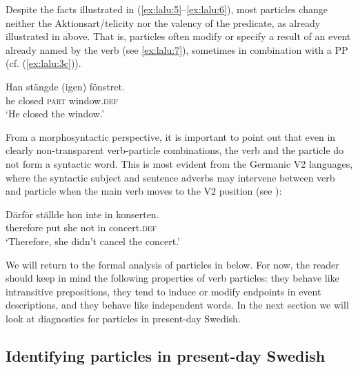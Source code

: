 \documentclass[output=paper]{langscibook}
\begin{document}
\ea\label{ex:lalu:6}
\z
\z

Despite the facts illustrated in (\ref{ex:lalu:5}--\ref{ex:lalu:6}), most particles change neither the Aktionsart/telicity nor the valency of the predicate, as already illustrated in  above. That is, particles often modify or specify a result of an event already named by the verb (see \ref{ex:lalu:7}), sometimes in combination with a PP (cf. (\ref{ex:lalu:3c})).


\ea\label{ex:lalu:7}
\gll  Han     stängde   (igen)   fönstret.\\
he       closed     \textsc{part}     window.\textsc{def}\\
\glt `He closed the window.'
\z

From a morphosyntactic perspective, it is important to point out that even in clearly non-transparent verb-particle combinations, the verb and the particle do not form a syntactic word. This is most evident from the Germanic V2 languages, where the syntactic subject and sentence adverbs may intervene between verb and particle when the main verb moves to the V2 position (see \citealt{Afarli1985}):


\ea\label{ex:lalu:8}
\gll  Därför   ställde   hon     inte     in   konserten.\\
therefore  put   she   not     in     concert.\textsc{def}\\
\glt `Therefore, she didn’t cancel the concert.'
\z


We will return to the formal analysis of particles in  below. For now, the reader should keep in mind the following properties of verb particles: they behave like intransitive prepositions, they tend to induce or modify endpoints in event descriptions, and they behave like independent words. In the next section we will look at diagnostics for particles in present-day Swedish.


\subsection{Identifying particles in present-day Swedish}\label{sec:lalu:2.2}
\end{document}
